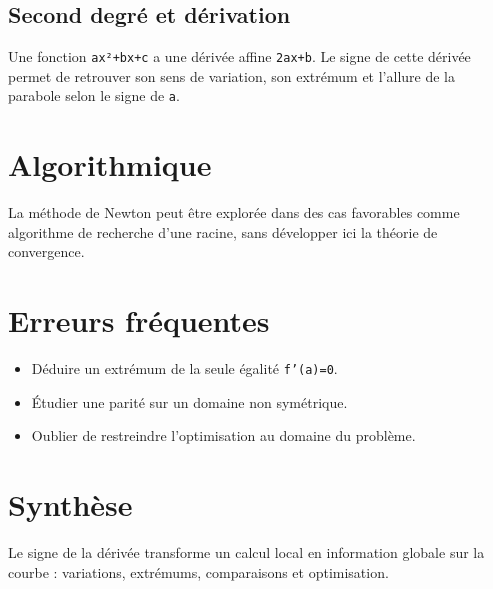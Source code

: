 \subsection{Second degré et dérivation}
Une fonction \texttt{ax²+bx+c} a une dérivée affine \texttt{2ax+b}. Le signe de cette dérivée permet de retrouver son sens de variation, son extrémum et l'allure de la parabole selon le signe de \texttt{a}.

\section{Algorithmique}
La méthode de Newton peut être explorée dans des cas favorables comme algorithme de recherche d'une racine, sans développer ici la théorie de convergence.

\section{Erreurs fréquentes}
\begin{itemize}
\item Déduire un extrémum de la seule égalité \texttt{f'(a)=0}.
\item Étudier une parité sur un domaine non symétrique.
\item Oublier de restreindre l'optimisation au domaine du problème.
\end{itemize}

\section{Synthèse}
Le signe de la dérivée transforme un calcul local en information globale sur la courbe : variations, extrémums, comparaisons et optimisation.
